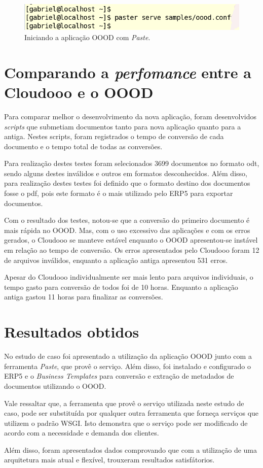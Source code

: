 \begin{figure}[!ht]
\centering
\begin{center}
\includegraphics[scale=0.570,bb=0 30 510 0]{start_paste.png}
\end{center}
\caption{Iniciando a aplicação OOOD com \textit{Paste}.}
\label{fig:start_paste}
\end{figure}

\section{Comparando a \textit{perfomance} entre a Cloudooo e o OOOD}

Para comparar melhor o desenvolvimento da nova aplicação, foram desenvolvidos \textit{scripts} que submetiam documentos tanto para nova aplicação quanto para a antiga. Nestes scripts, foram registrados o tempo de conversão de cada documento e o tempo total de todas as conversões.

Para realização destes testes foram selecionados 3699 documentos no formato odt, sendo alguns destes inválidos e outros em formatos desconhecidos. Além disso, para realização destes testes foi definido que o formato destino dos documentos fosse o pdf, pois este formato é o mais utilizado pelo ERP5 para exportar documentos.

Com o resultado dos testes, notou-se que a conversão do primeiro documento é mais rápida no OOOD. Mas, com o uso excessivo das aplicações e com os erros gerados, o Cloudooo se manteve estável enquanto o OOOD apresentou-se instável em relação ao tempo de conversão. Os erros apresentados pelo Cloudooo foram 12 de arquivos inválidos, enquanto a aplicação antiga apresentou 531 erros.

Apesar do Cloudooo individualmente ser mais lento para arquivos individuais, o tempo gasto para conversão de todos foi de 10 horas. Enquanto a aplicação antiga gastou 11 horas para finalizar as conversões.

\section{Resultados obtidos}

No estudo de caso foi apresentado a utilização da aplicação OOOD junto com a ferramenta \textit{Paste}, que provê o serviço. Além disso, foi  instalado e configurado o ERP5 e o \textit{Business Templates} para conversão e extração de metadados de documentos utilizando o OOOD.

Vale ressaltar que, a ferramenta que provê o serviço utilizada neste estudo de caso, pode ser substituída por qualquer outra ferramenta que forneça serviços que utilizem o padrão WSGI. Isto demonstra que o serviço pode ser modificado de acordo com a necessidade e demanda dos clientes.

Além disso, foram apresentados dados comprovando que com a utilização de uma arquitetura mais atual e flexível, trouxeram resultados satisfátorios.
